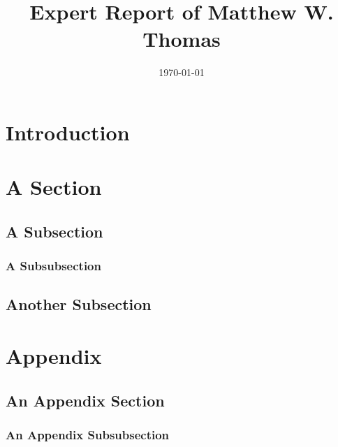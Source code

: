 \documentclass[12pt]{expert-report}
\title{Expert Report of Matthew W. Thomas}
\date{\today}
\begin{document}
\maketitle

\tableofcontents

\section{Introduction}

\econ[2-3]

\section{A Section}

\econ[4]

\subsection{A Subsection}

\econ[5-7]

\subsubsection{A Subsubsection}

\econ[8-10]

\subsection{Another Subsection}

\econ[11-15]

\section{Appendix}

\subsection{An Appendix Section}
\econ[16-20]

\subsubsection{An Appendix Subsubsection}
\econ[21-25]
\end{document}
